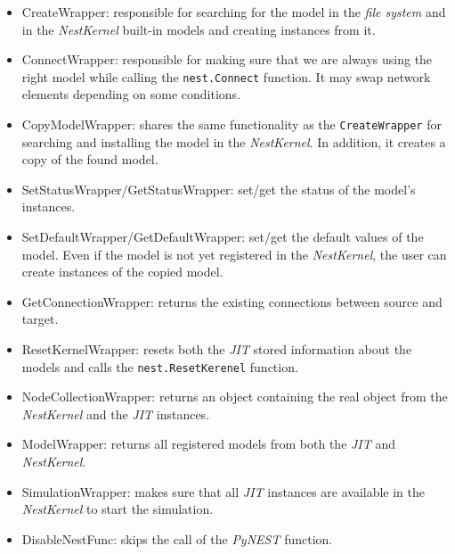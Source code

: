 \begin{itemize}
   \item CreateWrapper: responsible for searching for the model in the \emph{file system} and in the \emph{NestKernel} built-in models and creating instances from it. \\
   
   \item ConnectWrapper:  responsible for making sure that we are always using the right model while calling the \texttt{nest.Connect} function. It may swap network elements depending on some conditions. \\
   
   \item CopyModelWrapper: shares the same functionality as the \texttt{CreateWrapper} for searching and installing the model in the \emph{NestKernel}. In addition, it creates a copy of the found model.
   
   \item SetStatusWrapper/GetStatusWrapper: set/get the status of the model's instances.\\
   
   
   \item SetDefaultWrapper/GetDefaultWrapper: set/get the default values of the model. Even if the model is not yet registered in the \emph{NestKernel}, the user can create  instances of the copied model.\\
   
   \item GetConnectionWrapper: returns the existing connections between source and target.
   
   \item ResetKernelWrapper: resets both the \emph{JIT} stored information about the models and  calls the \texttt{nest.ResetKerenel} function.\\
   
   \item NodeCollectionWrapper: returns an object containing the real object from the \emph{NestKernel} and the \emph{JIT} instances.\\
   
   \item ModelWrapper: returns all registered models from both the \emph{JIT} and \emph{NestKernel}.\\
   
   \item SimulationWrapper: makes sure that all \emph{JIT} instances are available in the \emph{NestKernel} to start the simulation.\\
   
   \item DisableNestFunc: skips the call of the \emph{PyNEST} function.
\end{itemize}   
   

